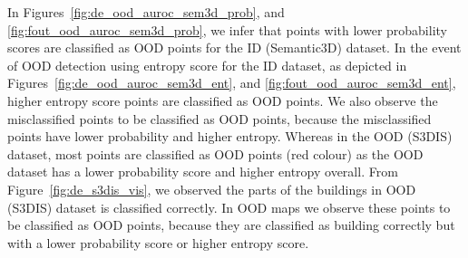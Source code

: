     In Figures~\ref{fig:de_ood_auroc_sem3d_prob}, and \ref{fig:fout_ood_auroc_sem3d_prob}, we infer that points with lower probability scores are classified as OOD points for the ID (Semantic3D) dataset.
    In the event of OOD detection using entropy score for the ID dataset, as depicted in Figures~\ref{fig:de_ood_auroc_sem3d_ent}, and \ref{fig:fout_ood_auroc_sem3d_ent}, higher entropy score points are classified as OOD points.
    We also observe the misclassified points to be classified as OOD points, because the misclassified points have lower probability and higher entropy.
    Whereas in the OOD (S3DIS) dataset, most points are classified as OOD points (red colour) as the OOD dataset has a lower probability score and higher entropy overall.
    From Figure~\ref{fig:de_s3dis_vis}, we observed the parts of the buildings in OOD (S3DIS) dataset is classified correctly.
    In OOD maps we observe these points to be classified as OOD points, because they are classified as building correctly but with a lower probability score or higher entropy score.
